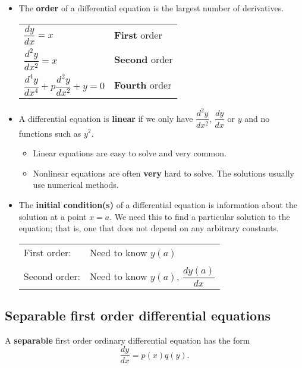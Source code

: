 \begin{itemize}
\item The \textbf{order} of a differential equation is the largest
number of derivatives.

\begingroup
\renewcommand{\arraystretch}{2}
\begin{tabular}[3]{ll}
$\dfrac{dy}{dx}  =  x$ & \textbf{First} order \\
$\dfrac{d^2y}{dx^2}  =  x$ & \textbf{Second} order \\
$\dfrac{d^4y}{dx^4} + p \dfrac{d^2y}{dx^2} + y  =  0$ &
\textbf{Fourth} order
\end{tabular}
\endgroup

\item A differential equation is \textbf{linear} if we only have
$\dfrac{d^2y}{dx^2}$, $\dfrac{dy}{dx}$ or $y$ and no functions such
as $y^2$.

\begin{itemize}
\item Linear equations are easy to solve and very common.

\item Nonlinear equations are often \textbf{very} hard to
solve.  The solutions usually use numerical methods.
\end{itemize}

\item The \textbf{initial condition(s)} of a differential equation
is information about the solution at a point $x=a$. We need this to find a particular solution to the equation; that is, one that does not depend on any arbitrary constants.

\begin{tabular}{ll}
 First order: & Need to know $y(a)$ \\\\
 Second order: & Need to know $y(a)$, $\dfrac{dy(a)}{dx}$
\end{tabular}
\end{itemize}



\subsection{Separable first order differential equations}  \label{sect:sepdiff}

\begin{definition}
A \textbf{separable} first order ordinary differential equation has
the form
\[
\dfrac{dy}{dx}  =  p(x)q(y).
\]
\end{definition}

